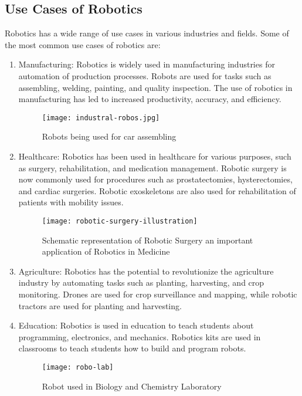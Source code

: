 \subsection{Use Cases of Robotics}
Robotics has a wide range of use cases in various industries and fields. Some of the most common use cases of robotics are:
\begin{enumerate}
    \item Manufacturing: Robotics is widely used in manufacturing industries for automation of production processes. Robots are used for tasks such as assembling, welding, painting, and quality inspection. The use of robotics in manufacturing has led to increased productivity, accuracy, and efficiency.
    
    \begin{figure}[H]
        \centering
        \texttt{[image: industral-robos.jpg]}
        \caption[Car assembling robots]{Robots being used for car assembling} 
    \end{figure}

    \item Healthcare: Robotics has been used in healthcare for various purposes, such as surgery, rehabilitation, and medication management. Robotic surgery is now commonly used for procedures such as prostatectomies, hysterectomies, and cardiac surgeries. Robotic exoskeletons are also used for rehabilitation of patients with mobility issues.
    
    \begin{figure}[H]
    \centering
    \texttt{[image: robotic-surgery-illustration]}
    \caption[Robotic surgery schematic diagram]{Schematic representation of Robotic Surgery an important application of Robotics in Medicine} 
\end{figure}

    \item Agriculture: Robotics has the potential to revolutionize the agriculture industry by automating tasks such as planting, harvesting, and crop monitoring. Drones are used for crop surveillance and mapping, while robotic tractors are used for planting and harvesting.

    \item Education: Robotics is used in education to teach students about programming, electronics, and mechanics. Robotics kits are used in classrooms to teach students how to build and program robots.
    
    \begin{figure}[H]
        \centering
        \texttt{[image: robo-lab]}
        \caption[Robot used in Biology and Chemistry lab]{Robot used in Biology and Chemistry Laboratory} 
    \end{figure}


\end{enumerate}
